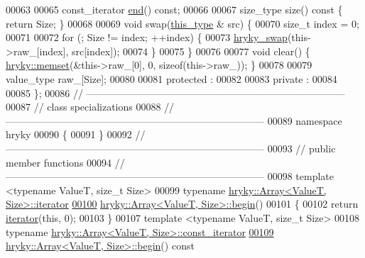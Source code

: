 \begin{DoxyCode}
00063 
00065     const\_iterator \hyperlink{classhryky_1_1_array_a56e39a6620eeb368c9b237a82d7507bb}{end}() \textcolor{keyword}{const};
00066 
00067     size\_type       size()\textcolor{keyword}{ const }\{ \textcolor{keywordflow}{return} Size; \}
00068 
00069     \textcolor{keywordtype}{void} swap(\hyperlink{classhryky_1_1_array_ace26d248a47909ee3875cb7b5a2047e6}{this_type} & src) \{
00070         \textcolor{keywordtype}{size\_t} index = 0;
00071 
00072         \textcolor{keywordflow}{for} (; Size != index; ++index) \{
00073             \hyperlink{namespacehryky_add9c1c1fdfda07cd47bcb7c16d3a823a}{hryky_swap}(this->raw\_[index], src[index]);
00074         \}
00075     \}
00076 
00077     \textcolor{keywordtype}{void} clear() \{ \hyperlink{namespacehryky_a50f9095eab4dc96e5fa813f8fc8fba7e}{hryky::memset}(&this->raw\_[0], 0, \textcolor{keyword}{sizeof}(this->raw\_)); \}
00078 
00079     value\_type      raw\_[Size];
00080 
00081 \textcolor{keyword}{protected} :
00082 
00083 \textcolor{keyword}{private} :
00084 
00085 \};
00086 \textcolor{comment}{//
      ------------------------------------------------------------------------------}
00087 \textcolor{comment}{// class specializations}
00088 \textcolor{comment}{//
      ------------------------------------------------------------------------------}
00089 \textcolor{keyword}{namespace }hryky
00090 \{
00091 \}
00092 \textcolor{comment}{//
      ------------------------------------------------------------------------------}
00093 \textcolor{comment}{// public member functions}
00094 \textcolor{comment}{//
      ------------------------------------------------------------------------------}
00098 \textcolor{comment}{}\textcolor{keyword}{template} <\textcolor{keyword}{typename} ValueT, \textcolor{keywordtype}{size\_t} Size>
00099 \textcolor{keyword}{typename} \hyperlink{classhryky_1_1iterator_1_1random_1_1_mutable}{hryky::Array<ValueT, Size>::iterator}
\hypertarget{array_8h_source_l00100}{}\hyperlink{classhryky_1_1_array_a12db8f567aa91dbbae25dca68db6e4d3}{00100} \hyperlink{classhryky_1_1_array_a12db8f567aa91dbbae25dca68db6e4d3}{hryky::Array<ValueT, Size>::begin}()
00101 \{
00102     \textcolor{keywordflow}{return} \hyperlink{classhryky_1_1iterator_1_1random_1_1_mutable}{iterator}(\textcolor{keyword}{this}, 0);
00103 \}
00107 \textcolor{keyword}{template} <\textcolor{keyword}{typename} ValueT, \textcolor{keywordtype}{size\_t} Size>
00108 \textcolor{keyword}{typename} \hyperlink{classhryky_1_1iterator_1_1random_1_1_immutable}{hryky::Array<ValueT, Size>::const_iterator}
\hypertarget{array_8h_source_l00109}{}\hyperlink{classhryky_1_1_array_a2e6fb08c9e286b0f33e17b98182a4cc7}{00109} \hyperlink{classhryky_1_1_array_a12db8f567aa91dbbae25dca68db6e4d3}{hryky::Array<ValueT, Size>::begin}()\textcolor{keyword}{ const}

\end{DoxyCode}
